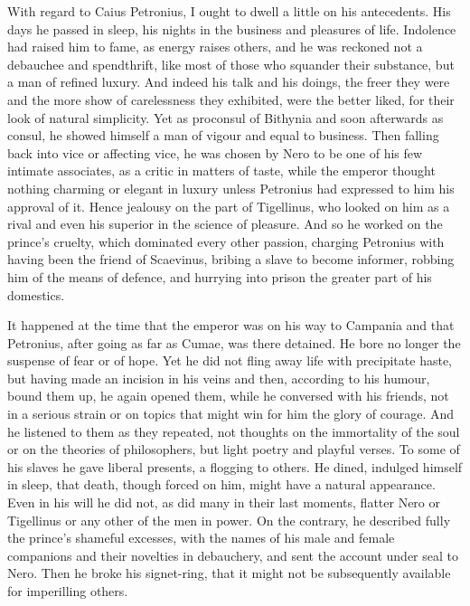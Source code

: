 
With regard to Caius Petronius, I ought to dwell a little on his antecedents. His days he passed in sleep, his nights in the business and pleasures of life. Indolence had raised him to fame, as energy raises others, and he was reckoned not a debauchee and spendthrift, like most of those who squander their substance, but a man of refined luxury. And indeed his talk and his doings, the freer they were and the more show of carelessness they exhibited, were the better liked, for their look of natural simplicity. Yet as proconsul of Bithynia and soon afterwards as consul, he showed himself a man of vigour and equal to business. Then falling back into vice or affecting vice, he was chosen by Nero to be one of his few intimate associates, as a critic in matters of taste, while the emperor thought nothing charming or elegant in luxury unless Petronius had expressed to him his approval of it. Hence jealousy on the part of Tigellinus, who looked on him as a rival and even his superior in the science of pleasure. And so he worked on the prince's cruelty, which dominated every other passion, charging Petronius with having been the friend of Scaevinus, bribing a slave to become informer, robbing him of the means of defence, and hurrying into prison the greater part of his domestics.


It happened at the time that the emperor was on his way to Campania and that Petronius, after going as far as Cumae, was there detained. He bore no longer the suspense of fear or of hope. Yet he did not fling away life with precipitate haste, but having made an incision in his veins and then, according to his humour, bound them up, he again opened them, while he conversed with his friends, not in a serious strain or on topics that might win for him the glory of courage. And he listened to them as they repeated, not thoughts on the immortality of the soul or on the theories of philosophers, but light poetry and playful verses. To some of his slaves he gave liberal presents, a flogging to others. He dined, indulged himself in sleep, that death, though forced on him, might have a natural appearance. Even in his will he did not, as did many in their last moments, flatter Nero or Tigellinus or any other of the men in power. On the contrary, he described fully the prince's shameful excesses, with the names of his male and female companions and their novelties in debauchery, and sent the account under seal to Nero. Then he broke his signet-ring, that it might not be subsequently available for imperilling others.

